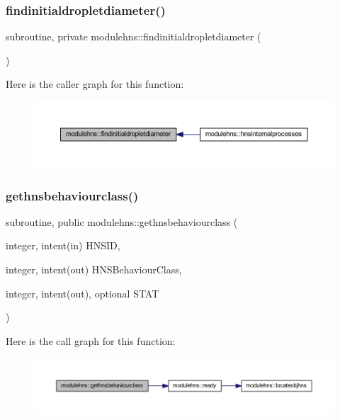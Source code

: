 \subsubsection{\texorpdfstring{findinitialdropletdiameter()}{findinitialdropletdiameter()}}
{\footnotesize\ttfamily subroutine, private modulehns\+::findinitialdropletdiameter (\begin{DoxyParamCaption}{ }\end{DoxyParamCaption})\hspace{0.3cm}{\ttfamily [private]}}

Here is the caller graph for this function\+:\nopagebreak
\begin{figure}[H]
\begin{center}
\leavevmode
\includegraphics[width=350pt]{namespacemodulehns_a837429821cbc45e6eb9a1c1aad7bef4e_icgraph}
\end{center}
\end{figure}
\mbox{\label{namespacemodulehns_a9a3b41c5caabf304ae3d502e0c7fe6e7}} 
\subsubsection{\texorpdfstring{gethnsbehaviourclass()}{gethnsbehaviourclass()}}
{\footnotesize\ttfamily subroutine, public modulehns\+::gethnsbehaviourclass (\begin{DoxyParamCaption}\item[{integer, intent(in)}]{H\+N\+S\+ID,  }\item[{integer, intent(out)}]{H\+N\+S\+Behaviour\+Class,  }\item[{integer, intent(out), optional}]{S\+T\+AT }\end{DoxyParamCaption})}

Here is the call graph for this function\+:\nopagebreak
\begin{figure}[H]
\begin{center}
\leavevmode
\includegraphics[width=350pt]{namespacemodulehns_a9a3b41c5caabf304ae3d502e0c7fe6e7_cgraph}
\end{center}
\end{figure}
\mbox{\label{namespacemodulehns_a4c50440c13ebd880d5f1b94bc868d428}} 
